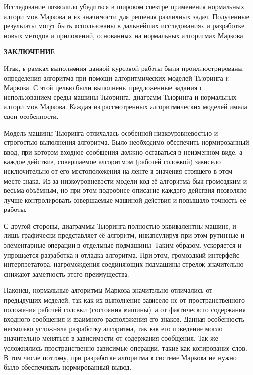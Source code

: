 \documentclass{article}
\begin{document}
\par Исследование позволило убедиться в широком спектре применения нормальных алгоритмов Маркова и их значимости для решения различных задач. Полученные результаты могут быть использованы в дальнейших исследованиях и разработке новых методов и приложений, основанных на нормальных алгоритмах Маркова.

\vspace{1cm}


\begin{center}
    \textbf{ЗАКЛЮЧЕНИЕ}
\end{center}

\par Итак, в рамках выполнения данной курсовой работы были проиллюстрированы определения алгоритма при помощи алгоритмических моделей Тьюринга и Маркова. С этой целью были выполнены предложенные задания с использованием среды машины Тьюринга, диаграмм Тьюринга и нормальных алгоритмов Маркова. Каждая из рассмотренных алгоритмических моделей имела свои особенности.\\

\par Модель машины Тьюринга отличалась особенной низкоуровневостью и строгостью выполнения алгоритма. Было необходимо обеспечить нормированный ввод, при котором входное сообщения должно оставаться в неизменном виде, а каждое действие, совершаемое алгоритмом (рабочей головкой) зависело исключительно от его местоположения на ленте и значения стоящего в этом месте знака. Из-за низкоуровневости модели код её алгоритма был громоздким и весьма объёмным, но при этом подробное описание каждого действия позволяло лучше контролировать совершаемые машиной действия и повышало точность её работы.\\

\par С другой стороны, диаграммы Тьюринга полностью эквивалентны машине, и лишь графически представляет её алгоритм, инкапсулируя при этом рутинные и элементарные операции в отдельные подмашины. Таким образом, ускоряется и упрощается разработка и отладка алгоритма. При этом, громоздкий интерфейс интерпретатора, нагромождения соединяющих подмашины стрелок значительно снижают заметность этого преимущества.\\

\par Наконец, нормальные алгоритмы Маркова значительно отличались от предыдущих моделей, так как их выполнение зависело не от пространственного положения рабочей головки (состояния машины), а от фактического содержания входного сообщения и взаимного расположения его знаков. Данная особенность несколько усложняла разработку алгоритма, так как его поведение могло значительно меняться в зависимости от содержания сообщения. Так же усложнялись пространственно зависимые операции, такие как копирование слов. В том числе поэтому, при разработке алгоритма в системе Маркова не нужно было обеспечивать нормированный вывод.\\
\end{document}
